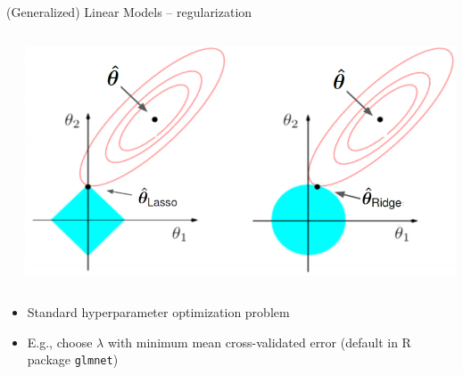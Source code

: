 \begin{frame}{(Generalized) Linear Models -- regularization}
\begin{columns}[c, totalwidth=\textwidth]
\begin{column}{0.55\textwidth}
    \end{column}
        \begin{column}{0.45\textwidth}
          \includegraphics[width=\textwidth]{figure/l1_l2_hat.png}
    \end{column}
\end{columns}

\medskip
{}

\begin{itemize}
  \item Standard hyperparameter optimization problem
  \item E.g., choose $\lambda$ with minimum mean cross-validated error 
  (default in R package \texttt{glmnet})
\end{itemize}
\end{frame}


